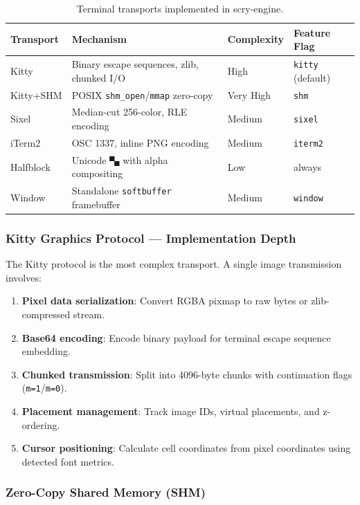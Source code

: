 \documentclass[11pt,a4paper]{article}
\begin{document}
\begin{table}[H]
\centering
\caption{Terminal transports implemented in scry-engine.}
\small
\begin{tabular}{llll}
\toprule
\textbf{Transport} & \textbf{Mechanism} & \textbf{Complexity} & \textbf{Feature Flag} \\
\midrule
Kitty & Binary escape sequences, zlib, chunked I/O & High & \texttt{kitty} (default) \\
Kitty+SHM & POSIX \texttt{shm\_open}/\texttt{mmap} zero-copy & Very High & \texttt{shm} \\
Sixel & Median-cut 256-color, RLE encoding & Medium & \texttt{sixel} \\
iTerm2 & OSC 1337, inline PNG encoding & Medium & \texttt{iterm2} \\
Halfblock & Unicode \texttt{▀▄} with alpha compositing & Low & always \\
Window & Standalone \texttt{softbuffer} framebuffer & Medium & \texttt{window} \\
\bottomrule
\end{tabular}
\end{table}

\subsubsection{Kitty Graphics Protocol --- Implementation Depth}

The Kitty protocol is the most complex transport. A single image
transmission involves:

\begin{enumerate}[nosep]
    \item \textbf{Pixel data serialization}: Convert RGBA pixmap to raw
          bytes or zlib-compressed stream.
    \item \textbf{Base64 encoding}: Encode binary payload for terminal
          escape sequence embedding.
    \item \textbf{Chunked transmission}: Split into 4096-byte chunks
          with continuation flags (\texttt{m=1}/\texttt{m=0}).
    \item \textbf{Placement management}: Track image IDs, virtual
          placements, and z-ordering.
    \item \textbf{Cursor positioning}: Calculate cell coordinates from
          pixel coordinates using detected font metrics.
\end{enumerate}

\subsubsection{Zero-Copy Shared Memory (SHM)}
\end{document}
